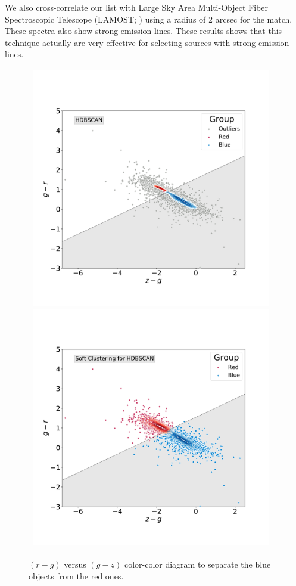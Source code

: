 \documentclass[fleqn,usenatbib]{mnras}
\begin{document}
We also cross-correlate our list with Large Sky Area Multi-Object Fiber Spectroscopic Telescope
(LAMOST; \citealp{Wu:2011}) using a radius of 2 arcsec for the match.  These spectra also
show strong emission lines. These results shows that this technique actually are very effective
for selecting sources with strong emission lines.

\begin{figure}
\centering
\begin{tabular}{l l}
  \includegraphics[width=0.5\linewidth, trim=10 10 5 8, clip]{Figs/blued-red-hdbscan.pdf}
   \includegraphics[width=0.5\linewidth, trim=10 10 5 8, clip]{Figs/blue-red-hdbscan-soft-alternative.pdf}
  \end{tabular}  
  \caption{$(r - g)$ versus $(g - z)$ color-color diagram to separate the blue objects 
  from the red ones.}
\label{fig:hdbscan}
\end{figure}
\end{document}
